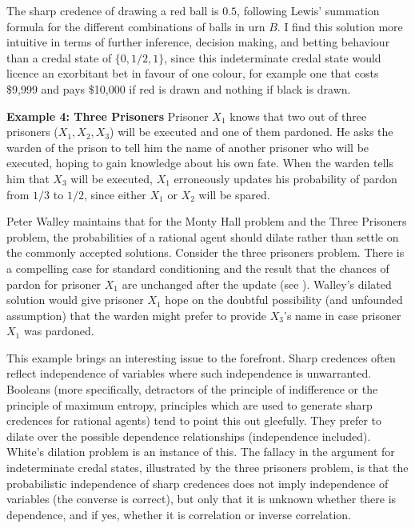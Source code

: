 The sharp credence of drawing a red ball is $0.5$,
following Lewis' summation formula for the different
combinations of balls in urn $B$. I find this solution
more intuitive in terms of further inference, decision
making, and betting behaviour than a credal state of
$\{0,1/2,1\}$, since this indeterminate credal state
would licence an exorbitant bet in favour of one
colour, for example one that costs \$9,999 and pays
\$10,000 if red is drawn and nothing if black is drawn.

\begin{quotex}
  \textbf{Example 4: Three Prisoners} Prisoner $X_{1}$
  knows that two out of three prisoners
  ($X_{1},X_{2},X_{3}$) will be executed and one of
  them pardoned. He asks the warden of the prison to
  tell him the name of another prisoner who will be
  executed, hoping to gain knowledge about his own
  fate. When the warden tells him that $X_{3}$ will be
  executed, $X_{1}$ erroneously updates his probability
  of pardon from $1/3$ to $1/2$, since either $X_{1}$
  or $X_{2}$ will be spared.
\end{quotex}

Peter Walley maintains that for the Monty Hall problem
and the Three Prisoners problem, the probabilities of a
rational agent should dilate rather than settle on the
commonly accepted solutions. Consider the three
prisoners problem. There is a compelling case for
standard conditioning and the result that the chances
of pardon for prisoner $X_{1}$ are unchanged after the
update (see ). Walley's
dilated solution would give prisoner $X_{1}$ hope on
the doubtful possibility (and unfounded assumption)
that the warden might prefer to provide $X_{3}$'s name
in case prisoner $X_{1}$ was pardoned.

This example brings an interesting issue to the
forefront. Sharp credences often reflect independence
of variables where such independence is unwarranted.
Booleans (more specifically, detractors of the
principle of indifference or the principle of maximum
entropy, principles which are used to generate sharp
credences for rational agents) tend to point this out
gleefully. They prefer to dilate over the possible
dependence relationships (independence included).
White's dilation problem is an instance of this. The
fallacy in the argument for indeterminate credal
states, illustrated by the three prisoners problem, is
that the probabilistic independence of sharp credences
does not imply independence of variables (the converse
is correct), but only that it is unknown whether there
is dependence, and if yes, whether it is correlation or
inverse correlation.


